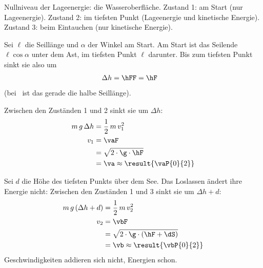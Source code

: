 Nullniveau der Lageenergie: die Wasseroberfläche. Zustand 1: am Start (nur Lageenergie). Zustand 2: im tiefsten Punkt (Lageenergie und kinetische Energie). Zustand 3: beim Eintauchen (nur kinetische Energie).

Sei $\ell$ die Seillänge und $\alpha$ der Winkel am Start. Am Start ist das Seilende $\ell\cos\alpha$ unter dem Ast, im tiefsten Punkt $\ell$ darunter. Bis zum tiefsten Punkt sinkt sie also um
\begin{align}
 \Delta h &= \hFF = \hF
\end{align}
(bei \waO\ ist das gerade die halbe Seillänge).

\begin{abcliste}
\abc
Zwischen den Zuständen 1 und 2 sinkt sie um $\Delta h$:
\begin{align}
 m\,g\,\Delta h &= \frac{1}{2}\,m\,v_1^2 \\
 v_1 &= \vaF \\
   &= \sqrt{2\cdot\g\cdot\hF} \\
   &= \va \approx \result{\vaP{0}{2}}
\end{align}

\abc
Sei $d$ die Höhe des tiefsten Punkts über dem See. Das Loslassen ändert ihre Energie nicht: Zwischen den Zuständen 1 und 3 sinkt sie um $\Delta h + d$:
\begin{align}
 m\,g\,(\Delta h+d) &= \frac{1}{2}\,m\,v_2^2 \\
 v_2 &= \vbF \\
   &= \sqrt{2\cdot\g\cdot(\hF+\dS)} \\
   &= \vb \approx \result{\vbP{0}{2}}
\end{align}
Geschwindigkeiten addieren sich nicht, Energien schon.
\end{abcliste}
